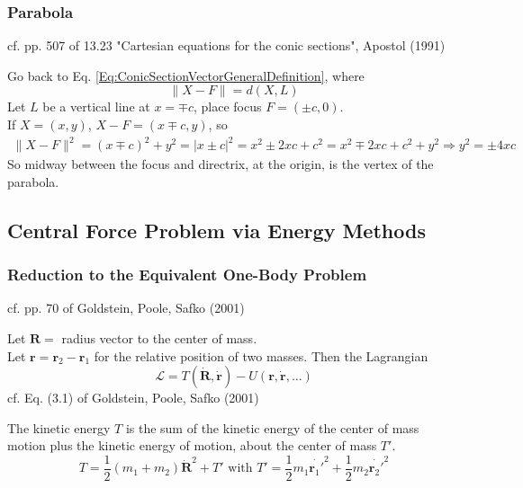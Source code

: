 \documentclass[10pt]{amsart}
\begin{document}
\begin{multicols*}{2}
\subsubsection{Parabola}

cf. pp. 507 of  13.23 "Cartesian equations for the conic sections", Apostol (1991) \cite{Apos1991}

Go back to Eq. \ref{Eq:ConicSectionVectorGeneralDefinition}, where
\[
\| X - F \| = d(X, L)
\]
Let $L$ be a vertical line at $x = \mp c$, place focus $F = (\pm c, 0)$. \\
If $X = (x,y)$, $X-F = (x \mp c, y)$, so 
\[
\begin{gathered}
\| X- F \|^2 = (x \mp c)^2 + y^2 = | x \pm c|^2 = x^2 \pm 2xc + c^2 = x^2 \mp 2xc + c^2 + y^2
\Longrightarrow y^2 = \pm 4xc
\end{gathered}
\]
So midway between the focus and directrix, at the origin, is the vertex of the parabola.

\subsection{Central Force Problem via Energy Methods}

\subsubsection{Reduction to the Equivalent One-Body Problem}

cf. pp. 70 of Goldstein, Poole, Safko (2001) \cite{GPS2001}

Let $\mathbf{R} = $ radius vector to the center of mass. \\

Let $\mathbf{r} = \mathbf{r}_2 - \mathbf{r}_1$ for the relative position of two masses. Then the Lagrangian
\begin{equation}
\mathcal{L} = T(\dot{\mathbf{R}}, \dot{ \mathbf{r}} ) - U (\mathbf{r}, \dot{\mathbf{r}}, \dots )
\end{equation}
cf. Eq. (3.1) of Goldstein, Poole, Safko (2001) \cite{GPS2001}

The kinetic energy $T$ is the sum of the kinetic energy of the center of mass motion plus the kinetic energy of motion, about the center of mass $T'$.
\[
T = \frac{1}{2} (m_1 + m_2) \dot{ \mathbf{R}}^2 + T' \text{ with } T' = \frac{1}{2} m_1 \dot{ \mathbf{r}_1'}^2 + \frac{1}{2} m_2 \dot{\mathbf{r}_2'}^2
\]


\end{multicols*}
\end{document}
